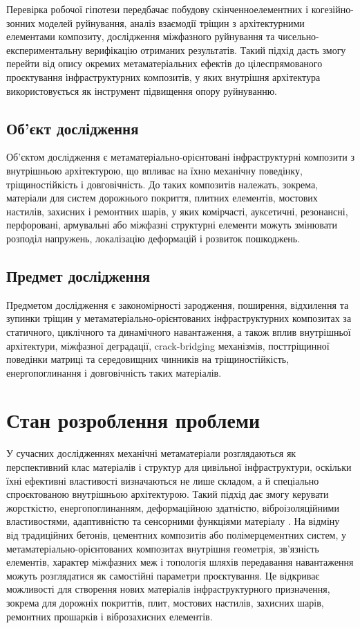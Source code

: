 \documentclass[12pt,a4paper]{article}
\begin{document}
Перевірка робочої гіпотези передбачає побудову скінченноелементних і когезійно-зонних моделей руйнування, аналіз взаємодії тріщин з архітектурними елементами композиту, дослідження міжфазного руйнування та чисельно-експериментальну верифікацію отриманих результатів. Такий підхід дасть змогу перейти від опису окремих метаматеріальних ефектів до цілеспрямованого проєктування інфраструктурних композитів, у яких внутрішня архітектура використовується як інструмент підвищення опору руйнуванню.


\subsection{Об'єкт дослідження}

Об'єктом дослідження є метаматеріально-орієнтовані інфраструктурні композити з внутрішньою архітектурою, що впливає на їхню механічну поведінку, тріщиностійкість і довговічність. До таких композитів належать, зокрема, матеріали для систем дорожнього покриття, плитних елементів, мостових настилів, захисних і ремонтних шарів, у яких комірчасті, ауксетичні, резонансні, перфоровані, армувальні або міжфазні структурні елементи можуть змінювати розподіл напружень, локалізацію деформацій і розвиток пошкоджень.


\subsection{Предмет дослідження}

Предметом дослідження є закономірності зародження, поширення, відхилення та зупинки тріщин у метаматеріально-орієнтованих інфраструктурних композитах за статичного, циклічного та динамічного навантаження, а також вплив внутрішньої архітектури, міжфазної деградації, crack-bridging механізмів, посттріщинної поведінки матриці та середовищних чинників на тріщиностійкість, енергопоглинання і довговічність таких матеріалів.


\section{Стан розроблення проблеми}

У сучасних дослідженнях механічні метаматеріали розглядаються як перспективний клас матеріалів і структур для цивільної інфраструктури, оскільки їхні ефективні властивості визначаються не лише складом, а й спеціально спроєктованою внутрішньою архітектурою. Такий підхід дає змогу керувати жорсткістю, енергопоглинанням, деформаційною здатністю, віброізоляційними властивостями, адаптивністю та сенсорними функціями матеріалу \cite{Moini2024,Premadasa2026,Wang2025,Alavi2026}. На відміну від традиційних бетонів, цементних композитів або полімерцементних систем, у метаматеріально-орієнтованих композитах внутрішня геометрія, зв'язність елементів, характер міжфазних меж і топологія шляхів передавання навантаження можуть розглядатися як самостійні параметри проєктування. Це відкриває можливості для створення нових матеріалів інфраструктурного призначення, зокрема для дорожніх покриттів, плит, мостових настилів, захисних шарів, ремонтних прошарків і віброзахисних елементів.
\end{document}
